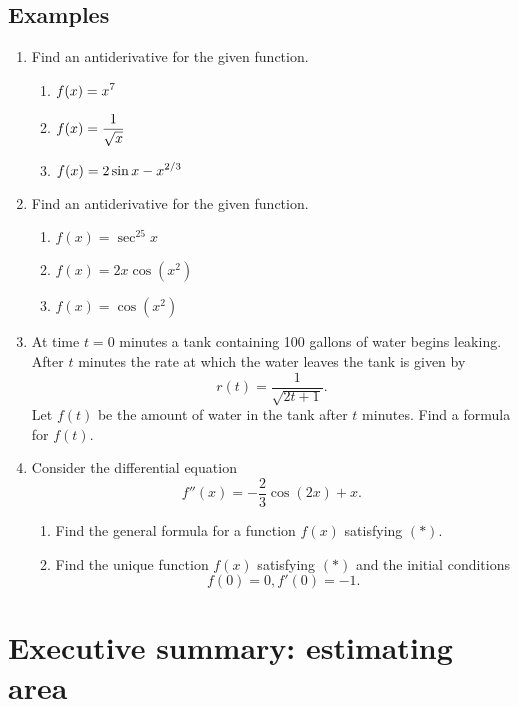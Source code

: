 \subsection*{Examples}
\begin{enumerate}
  \item Find an antiderivative for the given function.
  \begin{enumerate}
    \item $\displaystyle f(x)=x^7$
    \item $\displaystyle f(x)=\frac{1}{\sqrt{x}}$
    \item $\displaystyle f(x)=2\sin x-x^{2/3}$
  \end{enumerate}
  \item Find an antiderivative for the given function.
  \begin{enumerate}
    \item $f(x)=\sec^25x$
    \item $f(x)=2x\cos(x^2)$
    \item $f(x)=\cos(x^2)$
  \end{enumerate}
  \item At time $t=0$ minutes a tank containing 100 gallons of water begins leaking. After $t$ minutes the rate at which the water leaves the tank is given by
  \[
  r(t)=\frac{1}{\sqrt{2t+1}}.
  \]
  Let $f(t)$ be the amount of water in the tank after $t$ minutes. Find a formula for $f(t)$.

    \item Consider the differential equation
    \[
    f''(x)=-\frac{2}{3}\cos(2x)+x \tag{$*$}.
    \]
    \begin{enumerate}
      \item Find the general formula for a function $f(x)$ satisfying $(*)$.
      \item Find the unique function $f(x)$ satisfying $(*)$ and the initial conditions
      \[
      f(0)=0, f'(0)=-1.
      \]

  \end{enumerate}
\end{enumerate}




\newpage

\section{Executive summary: estimating area}

\thispagestyle{fancy}

